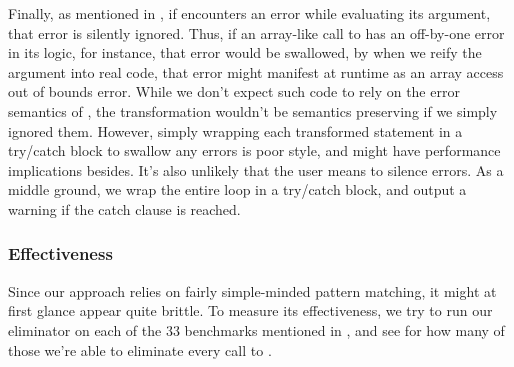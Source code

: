 Finally, as mentioned in , if  encounters an error
while evaluating its argument, that error is silently ignored. Thus, if an
array-like call to  has an off-by-one error in its logic, for
instance, that error would be swallowed, by when we reify the argument into
real code, that error might manifest at runtime as an array access out of
bounds error. While we don't expect such code to rely on the error semantics of
, the transformation wouldn't be semantics preserving if we simply
ignored them. However, simply wrapping each transformed statement in a
try/catch block to swallow any errors is poor style, and might have performance
implications besides. It's also unlikely that the user means to silence errors.
As a middle ground, we wrap the entire loop in a try/catch block, and output a
warning if the catch clause is reached.

\subsubsection{Effectiveness}

Since our approach relies on fairly simple-minded pattern matching, it might at
first glance appear quite brittle. To measure its effectiveness, we try to run
our eliminator on each of the 33 benchmarks mentioned in
, and see for how many of those we're able to
eliminate every call to .

